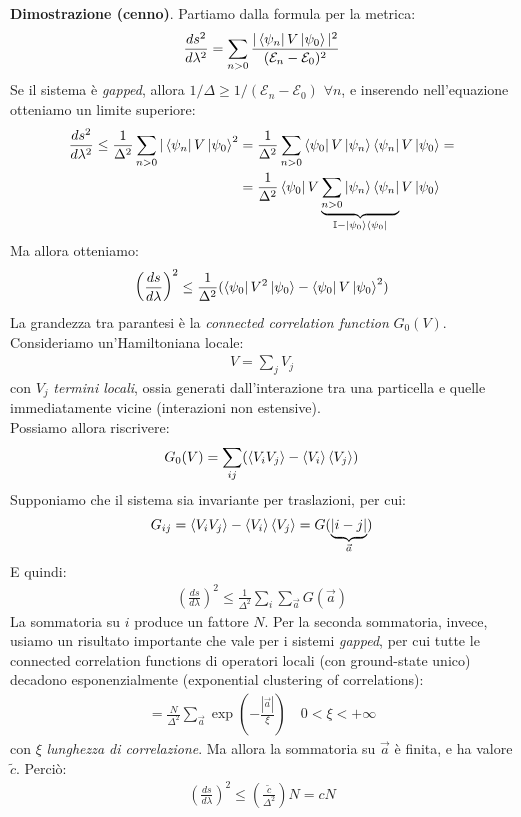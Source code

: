 \documentclass[../../InformazioneQuantistica.tex]{subfiles}
\begin{document}
\textbf{Dimostrazione (cenno)}.
Partiamo dalla formula per la metrica:
\begin{align*}
\frac{ds^2}{d\lambda^2} = \sum_{n>0} \frac{|\Bra{\psi_n}V\Ket{\psi_0}|^2}{(\mathcal{E}_n - \mathcal{E}_0)^2}
\end{align*}
Se il sistema è \textit{gapped}, allora $1/\Delta \geq 1/(\mathcal{E}_n -\mathcal{E}_0)$ $\forall n$, e inserendo nell'equazione otteniamo un limite superiore:
\begin{align*}
\frac{ds^2}{d\lambda^2} \leq \frac{1}{\Delta^2}\sum_{n>0} |\Bra{\psi_n}V \Ket{\psi_0}^2 &= \frac{1}{\Delta^2} \sum_{n>0} \Bra{\psi_0}V \Ket{\psi_n}\Bra{\psi_n}V \Ket{\psi_0}=\\
&= \frac{1}{\Delta^2} \Bra{\psi_0}V \underbrace{\sum_{n>0}\Ket{\psi_n}\Bra{\psi_n}}_{\mathbb{I}-\Ket{\psi_0}\Bra{\psi_0}}V \Ket{\psi_0}
\end{align*}
Ma allora otteniamo:
\begin{align*}
\left(\frac{ds}{d\lambda}\right)^2 \leq \frac{1}{\Delta^2} ( \Bra{\psi_0}V^2 \Ket{\psi_0} - \Bra{\psi_0}V \Ket{\psi_0}^2 )
\end{align*}
La grandezza tra parantesi è la \textit{connected correlation function} $G_0(V)$.\\
Consideriamo un'Hamiltoniana locale:
\begin{align*}
V = \sum_j V_j
\end{align*}
con $V_j$ \textit{termini locali}, ossia generati dall'interazione tra una particella e quelle immediatamente vicine (interazioni non estensive).\\
Possiamo allora riscrivere:
\begin{align*}
G_0(V) = \sum_{ij} ( \left\langle{V_iV_j}\right\rangle - \left\langle{V_i}\right\rangle\left\langle{V_j}\right\rangle)
\end{align*}
Supponiamo che il sistema sia invariante per traslazioni, per cui:
\begin{align*}
G_{ij} = \left\langle{V_i V_j}\right\rangle - \left\langle{V_i}\right\rangle\left\langle{V_j}\right\rangle = G(\underbrace{|i-j|}_{\vec{a}})
\end{align*}
E quindi:
\begin{align*}
\left(\frac{ds}{d\lambda}\right)^2 \leq \frac{1}{\Delta^2} \sum_i \sum_{\vec{a}} G(\vec{a})
\end{align*}
La sommatoria su $i$ produce un fattore $N$. Per la seconda sommatoria, invece, usiamo un risultato importante che vale per i sistemi \textit{gapped}, per cui tutte le  connected correlation functions di operatori locali (con ground-state unico) decadono esponenzialmente (exponential clustering of correlations):
\begin{align*}
 = \frac{N}{\Delta^2} \sum_{\vec{a}}\exp\left(-\frac{|\vec{a}|}{\xi}\right) \quad 0< \xi < +\infty
\end{align*}
con $\xi$ \textit{lunghezza di correlazione}. Ma allora la sommatoria su $\vec{a}$ è finita, e ha valore $\tilde{c}$. Perciò:
\begin{align*}
\left(\frac{ds}{d\lambda}\right)^2 \leq \left(\frac{\tilde{c}}{\Delta^2}\right) N = cN
\end{align*}
\end{document}
